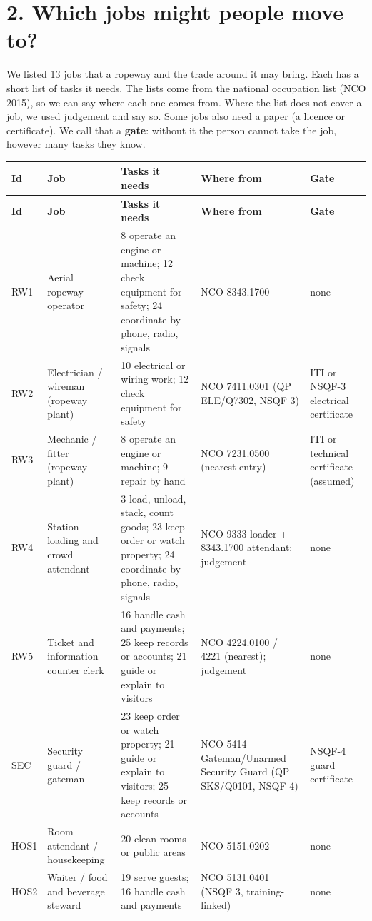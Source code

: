 \documentclass[11pt]{article}
\begin{document}
\section*{2. Which jobs might people move to?}
We listed 13 jobs that a ropeway and the trade around it may bring. Each has a short list of tasks it needs.
The lists come from the national occupation list (NCO 2015), so we can say where each one comes from. Where the list does not cover a job, we used judgement and say so.
Some jobs also need a paper (a licence or certificate). We call that a \textbf{gate}: without it the person cannot take the job, however many tasks they know.
{\scriptsize
\begin{longtable}{p{0.9cm}p{2.8cm}p{3.8cm}p{3.6cm}p{2.9cm}}
\toprule
\textbf{Id} & \textbf{Job} & \textbf{Tasks it needs} & \textbf{Where from} & \textbf{Gate} \\
\midrule
\endfirsthead
\toprule
\textbf{Id} & \textbf{Job} & \textbf{Tasks it needs} & \textbf{Where from} & \textbf{Gate} \\
\midrule
\endhead
RW1 & Aerial ropeway operator & 8 operate an engine or machine; 12 check equipment for safety; 24 coordinate by phone, radio, signals & NCO 8343.1700 & none \\
RW2 & Electrician / wireman (ropeway plant) & 10 electrical or wiring work; 12 check equipment for safety & NCO 7411.0301 (QP ELE/Q7302, NSQF 3) & ITI or NSQF-3 electrical certificate \\
RW3 & Mechanic / fitter (ropeway plant) & 8 operate an engine or machine; 9 repair by hand & NCO 7231.0500 (nearest entry) & ITI or technical certificate (assumed) \\
RW4 & Station loading and crowd attendant & 3 load, unload, stack, count goods; 23 keep order or watch property; 24 coordinate by phone, radio, signals & NCO 9333 loader + 8343.1700 attendant; judgement & none \\
RW5 & Ticket and information counter clerk & 16 handle cash and payments; 25 keep records or accounts; 21 guide or explain to visitors & NCO 4224.0100 / 4221 (nearest); judgement & none \\
SEC & Security guard / gateman & 23 keep order or watch property; 21 guide or explain to visitors; 25 keep records or accounts & NCO 5414 Gateman/Unarmed Security Guard (QP SKS/Q0101, NSQF 4) & NSQF-4 guard certificate \\
HOS1 & Room attendant / housekeeping & 20 clean rooms or public areas & NCO 5151.0202 & none \\
HOS2 & Waiter / food and beverage steward & 19 serve guests; 16 handle cash and payments & NCO 5131.0401 (NSQF 3, training-linked) & none \\

\end{longtable}}
\end{document}
